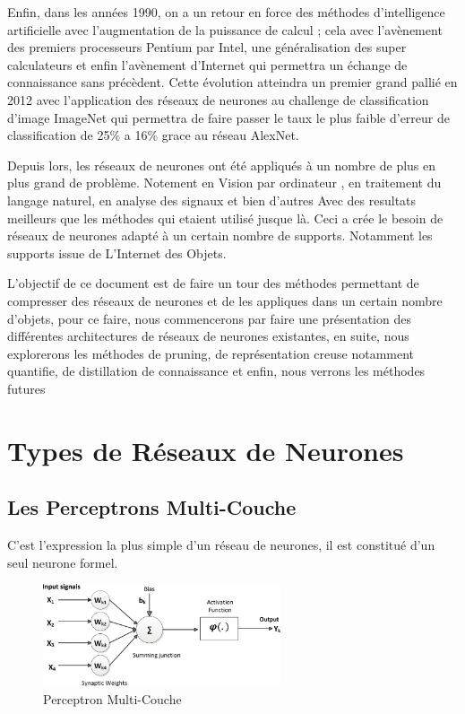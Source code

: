 \documentclass[twoside,twocolumn]{article}
\begin{document}
Enfin, dans les années 1990, on a un retour en force des méthodes d'intelligence artificielle avec l'augmentation de la puissance de calcul ; cela avec l'avènement
des premiers processeurs Pentium par Intel, une généralisation des super calculateurs et enfin l'avènement d'Internet qui permettra un échange de connaissance
sans précèdent. Cette évolution atteindra un premier grand pallié en 2012 avec l'application des réseaux de neurones au challenge de classification d'image ImageNet
qui permettra de faire passer le taux le plus faible d'erreur de classification de 25\% a 16\% grace au réseau AlexNet\cite{Rajat1}. 

Depuis lors, les réseaux de neurones ont été appliqués à un nombre de plus en plus grand de problème. Notement en Vision par ordinateur\cite{MadhusmitaSahu}
\cite{Sornaminproceedings}, en traitement du langage naturel\cite{jing2019survey}, en analyse des signaux\cite{MohamedIbn1}\cite{XiaofanLi1} et bien d'autres
\cite{POZNYAK2019250} Avec des resultats meilleurs que les méthodes qui etaient utilisé jusque là. Ceci a crée le besoin de réseaux de neurones adapté à un certain 
nombre de supports. Notamment les supports issue de L'Internet des Objets. 

L'objectif de ce document est de faire un tour des méthodes permettant de compresser des réseaux de neurones et de les appliques dans un certain nombre d'objets, 
pour ce faire, nous commencerons par faire une présentation des différentes architectures de réseaux de neurones existantes, en suite, nous explorerons les méthodes 
de pruning, de représentation creuse notamment quantifie, de distillation de connaissance et enfin, nous verrons les méthodes futures 


\section{Types de Réseaux de Neurones}

\subsection{Les Perceptrons Multi-Couche}

C'est l'expression la plus simple d'un réseau de neurones, il est constitué d'un seul neurone formel\cite{warren1}.

\begin{figure}[h]
  \centering
  \includegraphics[width=70mm]{McCulloch-Pitts-computational-model-of-a-neuron.png}
  \caption{Perceptron Multi-Couche}
  \label{PerceptronMathematique}
\end{figure}
\end{document}
